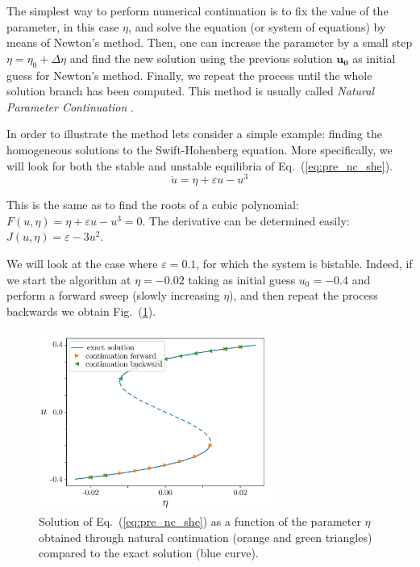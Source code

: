 The simplest way to perform numerical continuation is to fix the value of the parameter, in this case $\eta$, and solve
the equation (or system of equations) by means of Newton's method. Then, one can increase the 
parameter by a small step $\eta = \eta_0 + \Delta \eta$ and find the new solution using 
the previous solution $\bm{u_0}$ as initial guess for Newton's method. Finally, we repeat the process
until the whole solution branch has been computed. This method is usually called {\em Natural Parameter Continuation}
\cite{doedel2007lecture}.

\begin{exmp}
    In order to illustrate the method lets consider a simple
    example: finding the homogeneous solutions to the Swift-Hohenberg equation. More specifically,
    we will look for both the stable and unstable equilibria of Eq.~(\ref{eq:pre_nc_she}).    
    \begin{equation}
        \dot{u} = \eta + \varepsilon u - u^3
        \label{eq:pre_nc_she}
    \end{equation}

    This is the same
    as to find the roots of a cubic polynomial: $F(u, \eta) = \eta + \varepsilon u - u^3 = 0$. The derivative
    can be determined easily: $J(u, \eta) = \varepsilon - 3u^2$. 

    We will look at the case where $\varepsilon = 0.1$, for which the system is bistable. Indeed, if we start the algorithm
    at $\eta=-0.02$ taking as initial guess $u_0 = -0.4$ and perform a forward sweep (slowly increasing $\eta$), and then
    repeat the process backwards we obtain Fig.~(\ref{fig:pre_nc_she}).

    \begin{figure}[h]
        \centering
        \includegraphics[width=0.7\textwidth]{scripts/figures/natural_continuation_she.png}
        \caption[short]{Solution of Eq.~(\ref{eq:pre_nc_she}) as a function of the parameter $\eta$ obtained
        through natural continuation (orange and green triangles) compared to the exact solution (blue curve).}
        \label{fig:pre_nc_she}
    \end{figure}
\end{exmp}

